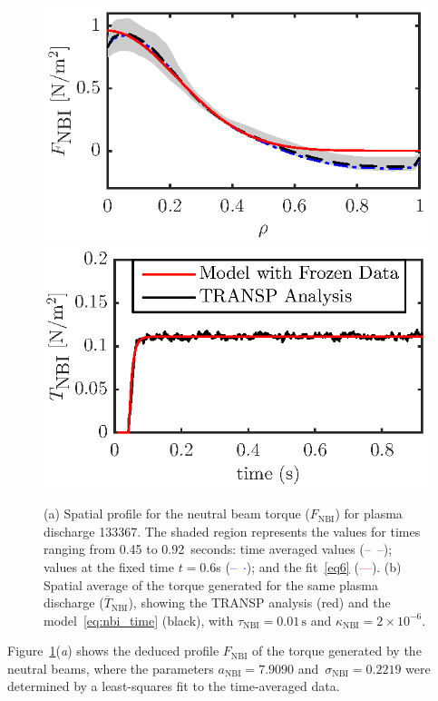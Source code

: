 \documentclass{iopart}
\begin{document}
\begin{figure}
\includegraphics{imene_figs/fig4a} \hspace{-2.7em} \\[-1em] %
\includegraphics{imene_figs/fig4b} \hspace{-2.7em}          %
\caption{(a) Spatial profile for the neutral beam torque ($F_\text{NBI} $) for
  plasma discharge 133367.  The shaded region represents the values for times
  ranging from 0.45 to 0.92~seconds: time averaged values (--~--); values at the
  fixed time $t=0.6$s  (\textcolor{blue}{--~$\cdot$}); and
  the fit~\eqref{eq6} (\textcolor{red}{---}).
  (b) Spatial average of the torque generated for the same plasma discharge
  ($ \overline{T}_\text{NBI}$), showing the TRANSP analysis
  (red) and the model~\eqref{eq:nbi_time} (black), with
  $\tau_\text{NBI} = 0.01\,\text{s}$ and  $\kappa_\text{NBI} =
  2\times10^{-6} $.}
\label{fig:Fnbi}
\end{figure}
%
Figure~{\ref{fig:Fnbi}}(\emph{a}) shows the deduced profile $F_\text{NBI}$ of
the torque generated by the neutral beams, where the parameters
$a_\text{NBI}= 7.9090$
and~$\sigma_\text{NBI}= 0.2219$ were determined by a least-squares fit to the
time-averaged data.
\end{document}
